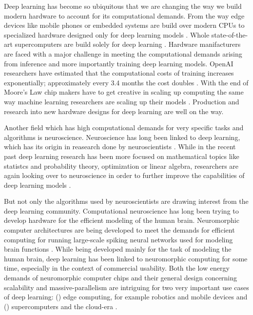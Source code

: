 \documentclass[]{article}
\begin{document}
Deep learning has become so ubiquitous that we are changing the
way we build modern hardware to account for its computational demands.
From the way edge devices like mobile phones or embedded systems are
build over modern CPUs to specialized hardware designed only for deep
learning models \citep{deng_2019, boitano_2020, perez_2017,
  jouppi_et_al_2017}.
Whole state-of-the-art supercomputers are build solely for deep
learning \citep{langston_2020}.
Hardware manifacturers are faced with a major challenge in meeting the
computational demands arising from inference and more importantly
training deep learning models.
OpenAI researchers have estimated that the computational costs of
training increases exponentially; approximately every 3.4 months the
cost doubles \citep{amodei_et_al_2019}.
With the end of Moore's Law chip makers have to get creative in
scaling up computing the same way machine learning researchers are
scaling up their models \citep{simonite_2016}.
Production and research into new hardware designs for deep learning
are well on the way.

Another field which has high computational demands for very specific
tasks and algorithms is neuroscience.
Neuroscience has long been linked to deep learning, which has its
origin in reasearch done by neuroscientists
\citep{mcculloch_et_al_1943}.
While in the recent past deep learning research has been more focused
on mathematical topics like statistcs and probability theory,
optimization or linear algebra, researchers are again looking over to
neuroscience in order to further improve the capabilities of deep
learning models \citep{marblestone_et_al_2016}.

But not only the algorithms used by neuroscientists are drawing
interest from the deep learning community.
Computational neuroscience has long been trying to develop hardware
for the efficient modeling of the human brain.
Neuromorphic computer architectures are being developed to meet the
demands for efficient computing for running large-scale spiking neural
networks used for modeling brain functions \citep{furber_2016}.
While being developed mainly for the task of modeling the human brain,
deep learning has been linked to neuromorphic computing for some time,
especially in the context of commercial usability.
Both the low energy demands of neuromorphic computer chips and their
general design concerning scalability and massive-parallelism are
intriguing for two very important use cases of deep learning:
() edge computing, for example robotics
and mobile devices and () supercomputers and the
cloud-era \citep{gomes_2017}.
\end{document}
